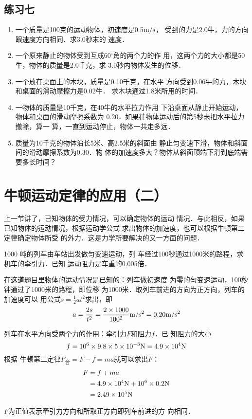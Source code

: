 \subsection*{练习七}
\begin{enumerate}
\item 一个质量是100克的运动物体，初速度是0.5$\text{m}/\text{s}$，
受到的力是2.0牛，力的方向跟速度方向相同．求3.0秒末的
速度．
\item 一个原来静止的物体受到互成60$^\circ$角的两个力的作
用，这两个力的大小都是50牛，物体的质量是2.0千克，求
3.0秒内物体发生的位移．
\item 一个放在桌面上的木块，质量是0.10千克，在水平
方向受到0.06牛的力，木块和桌面的滑动摩擦力是0.02牛．
求木块通过1.8米所用的时间．
\item 一物体的质量是10千克，在40牛的水平拉力作用
下沿桌面从静止开始运动，物体和桌面的滑动摩擦系数为
0.20．如果茌物体运动后的第5秒末把水平拉力撤除，算一
算，一直到运动停止，物体一共走多远．
\item  质量为10千克的物体沿长5米、高2.5米的斜面由
静止匀变速下滑，物体和斜面间的滑动摩擦系数为0.30．物
体的加速度多大？物体从斜面顶端下滑到底端需要多长时间？


\end{enumerate}

\section{牛顿运动定律的应用（二）}
上一节讲了，已知物体的受力情况，可以确定物体的运动
情况．与此相反，如果已知物体的运动情况，根据运动学公式
求出物体的加速度，也可以根据牛顿第二定律确定物体所受
的外力．这是力学所要解决的又一方面的问题．

\begin{example}
1000 吨的列车由车站出发做匀变速运动，列
车经过100秒通过1000米的路程，求机车的牵引力．已知
运动阻力是车重的0.005倍．
\end{example}

\begin{solution}
在这道题目里物体的运动情况是已知的：列车做初速度
为零的匀变速运动，100秒钟通过了1000米的路程，即位移
为1000米．取列车前进的方向为正方向，列车的加速度可以
用公式$s=\frac{1}{2}at^2$求出，即
\[a=\frac{2s}{t^2}=\frac{2\times 1000}{100^2}\text{m}/\text{s}^2=0.20\text{m}/\text{s}^2 \]

    列车在水平方向受两个力的作用：牵引力$F$和阻力$f$．已
知阻力的大小
\[f=10^6\times 9.8\times 5\times 10^{-3}{\rm N}=4.9\times 10^4{\rm N} \]
根据
牛顿第二定律$F_{\text{合}}=F-f=ma$就可以求出$F$：
\[\begin{split}
F&=f+ma\\
&=4.9\times 10^4{\rm N}+10^6\times 0.2{\rm N}\\
&=2.49\times 10^5{\rm N}
\end{split} \]

$F$为正值表示牵引力方向和所取正方向即列车前进的方
向相同．
\end{solution}


